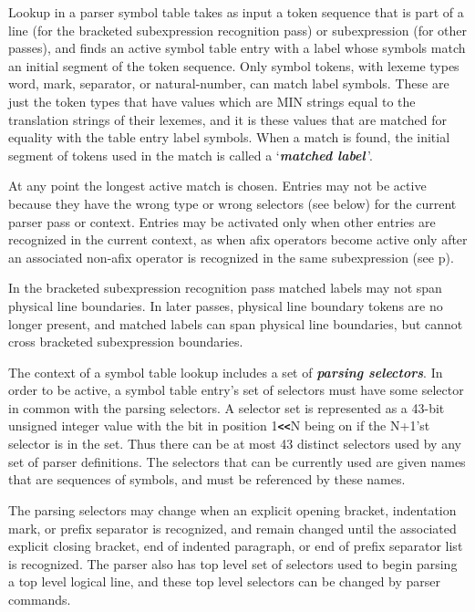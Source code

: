 \documentclass[12pt]{article}
\newcommand{\TT}[1]{{\tt \bfseries #1}}
\newcommand{\key}[1]{{\bf \em #1}\index{#1}}
\newcommand{\skey}[2]{{\bf \em #1#2}\index{#1}}
\newcommand{\pagref}[1]{p\pageref{#1}}
\begin{document}
Lookup in a parser symbol table takes as input a token sequence
that is part of a line (for the bracketed subexpression recognition pass)
or subexpression (for other passes), and finds an active symbol table
entry with a label whose symbols match an initial segment of the
token sequence.  Only symbol tokens, with lexeme types word,
mark, separator, or natural-number, can match label symbols.  These are just
the token types that have values which are MIN strings equal to the
translation strings of their lexemes, and it is these values that
are matched for equality with the table entry label symbols.
When a match is found,
the initial segment of tokens used in the match is called
a `\key{matched label}\,'.

At any point the longest active match is chosen.  Entries may
not be active because they have the wrong type or wrong selectors (see below)
for the current parser pass or context.
Entries may be activated only when other entries are recognized
in the current context, as when afix operators become active
only after an associated non-afix operator is recognized in
the same subexpression (see \pagref{AFIX-FLAG}).

In the bracketed
subexpression recognition pass matched labels may not span physical
line boundaries.
In later passes, physical line boundary tokens are no longer present, and
matched labels can span physical line boundaries,
but cannot cross bracketed subexpression
boundaries.

The context of a symbol table lookup includes a set of
\skey{parsing selector}s.\label{PARSING-SELECTORS}
In order to be active, a symbol table entry's set of selectors
must have some selector in common with the parsing selectors.
A selector set is represented as a 43-bit unsigned integer value
with the bit in
position 1\TT{<{}<}N being on if the N+1'st selector is in the set.
Thus there can be at most 43 distinct selectors used by any set of
parser definitions.  The selectors that can be
currently used are given names that are sequences of symbols,
and must be referenced by these names.

The parsing selectors may change when an explicit opening bracket,
indentation mark, or prefix separator
is recognized, and remain changed until the associated explicit closing
bracket, end of indented paragraph, or end of prefix separator list
is recognized.  The parser also has top level set of selectors
used to begin parsing a top level logical line, and these top level
selectors can be changed by parser commands.
\end{document}

